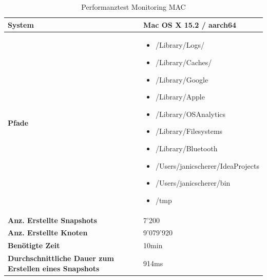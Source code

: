 \documentclass[a4paper,12pt]{report}
\begin{document}
    \begin{table}[h!]
        \centering
        \setlength{\leftmargini}{0.8cm}
        \begin{tabular}{|p{5cm}|p{10cm}|}
            \hline
            \textbf{System}                                               & Mac OS X 15.2 / aarch64 \\ \hline
            \textbf{Pfade} &
            \begin{itemize}
                \item /Library/Logs/
                \item /Library/Caches/
                \item /Library/Google
                \item /Library/Apple
                \item /Library/OSAnalytics
                \item /Library/Filesystems
                \item /Library/Bluetooth
                \item /Users/janicscherer/IdeaProjects
                \item /Users/janicscherer/bin
                \item /tmp
            \end{itemize}
            \\ \hline
            \textbf{Anz. Erstellte Snapshots}                             & 7'200                   \\ \hline
            \textbf{Anz. Erstellte Knoten}                                & 9'079'920               \\ \hline
            \textbf{Benötigte Zeit}                                       & 10min                   \\ \hline
            \textbf{Durchschnittliche Dauer zum Erstellen eines Snapshots} & 914ms                   \\ \hline
        \end{tabular}
        \caption{Performanztest Monitoring MAC}\label{tab:perf-monitoring-mac}
    \end{table}
\end{document}
